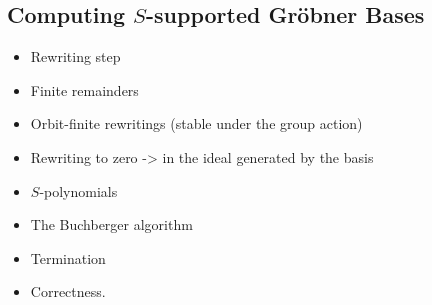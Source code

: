 \subsection{Computing $S$-supported Gröbner Bases}
\label{subsec:weakgbcomp}

\begin{itemize}
    \item Rewriting step
    \item Finite remainders
    \item Orbit-finite rewritings (stable under the group action)
    \item Rewriting to zero -> in the ideal generated by the basis
    \item $S$-polynomials 
    \item The Buchberger algorithm
    \item Termination
    \item Correctness.
\end{itemize}

